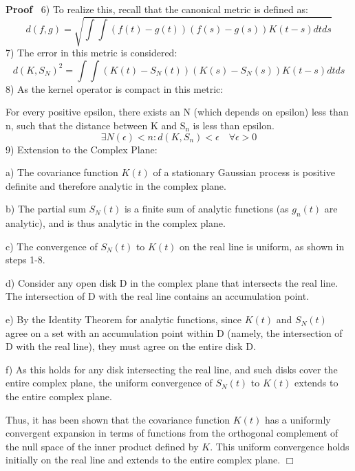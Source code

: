\documentclass{article}
\newcommand{\tmrsub}[1]{\ensuremath{_{\textrm{#1}}}}
\newenvironment{proof}{\noindent\textbf{Proof\ }}{\hspace*{\fill}$\Box$\medskip}
\begin{document}
\begin{proof}
  6) To realize this, recall that the canonical metric is defined as:
  \begin{equation}
    d (f, g) = \sqrt{\int \int (f (t) - g (t))  (f (s) - g (s)) K (t - s)
    dtds}
  \end{equation}
  7) The error in this metric is considered:
  \begin{equation}
    d (K, S_N)^2 = \int \int (K (t) - S_N (t))  (K (s) - S_N (s)) K (t - s)
    dtds
  \end{equation}
  8) As the kernel operator is compact in this metric:
  
  For every positive epsilon, there exists an N (which depends on epsilon)
  less than n, such that the distance between K and S\tmrsub{n} is less than
  epsilon.
  \begin{equation}
    \exists N (\epsilon) < n : d (K, S_n) < \epsilon \quad \forall \epsilon >
    0
  \end{equation}
  9) Extension to the Complex Plane:
  
  a) The covariance function $K (t)$ of a stationary Gaussian process is
  positive definite and therefore analytic in the complex plane.
  
  b) The partial sum $S_N (t)$ is a finite sum of analytic functions (as $g_n
  (t)$ are analytic), and is thus analytic in the complex plane.
  
  c) The convergence of $S_N (t)$ to $K (t)$ on the real line is uniform, as
  shown in steps 1-8.
  
  d) Consider any open disk D in the complex plane that intersects the real
  line. The intersection of D with the real line contains an accumulation
  point.
  
  e) By the Identity Theorem for analytic functions, since $K (t)$ and $S_N
  (t)$ agree on a set with an accumulation point within D (namely, the
  intersection of D with the real line), they must agree on the entire disk D.
  
  f) As this holds for any disk intersecting the real line, and such disks
  cover the entire complex plane, the uniform convergence of $S_N (t)$ to $K
  (t)$ extends to the entire complex plane.
  
  Thus, it has been shown that the covariance function $K (t)$ has a uniformly
  convergent expansion in terms of functions from the orthogonal complement of
  the null space of the inner product defined by $K$. This uniform convergence
  holds initially on the real line and extends to the entire complex plane.
\end{proof}
\end{document}
